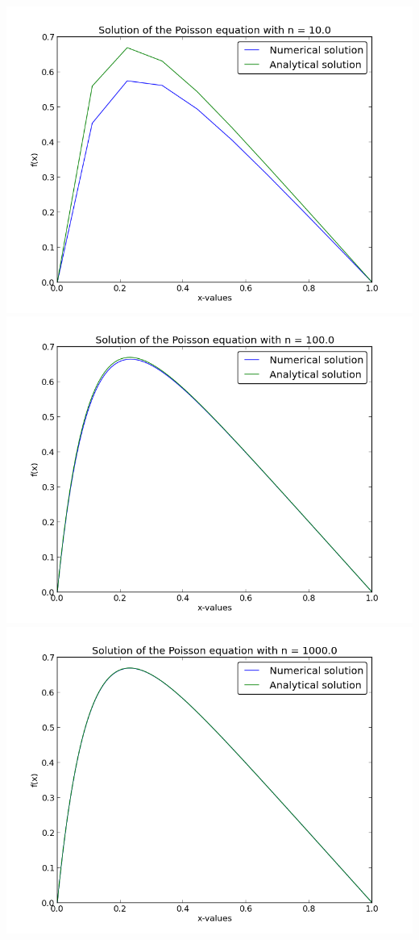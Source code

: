 \documentclass[a4paper,12pt, english]{article}
\begin{document}
\begin{enumerate}
\includegraphics[scale=0.5]{opgb_n10} 
\includegraphics[scale=0.5]{opgb_n100} 
\includegraphics[scale=0.5]{opgb_n1000} 


\end{enumerate}
\end{document}
